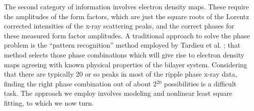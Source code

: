 The second category of information involves electron density maps.  These
require the amplitudes of the form factors, which are just
the square roots of the Lorentz corrected intensities of the x-ray 
scattering peaks,
and the correct phases for these measured form factor amplitudes.
A traditional approach to solve the phase problem is the 
``pattern recognition''
method employed by Tardieu et al. \cite{Tar73}; that method
selects those phase combinations which will give rise to electron density maps 
agreeing with known physical properties of the bilayer system.
Considering that there are typically 20 or so 
peaks in most of the ripple phase x-ray data, finding the right phase 
combination out of about 2$^{20}$ possibilities is a difficult task. 
The approach we employ involves modeling and nonlinear least square fitting, to 
which we now turn.


